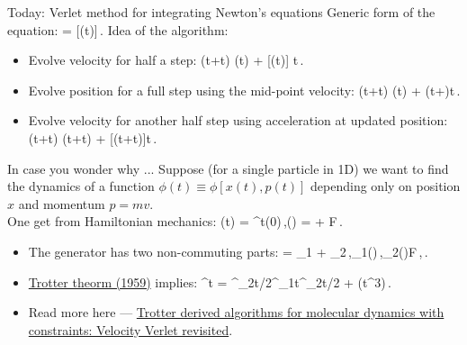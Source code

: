 \documentclass[11pt,aspectratio=169,handout]{beamer}
\begin{document}
\begin{frame}{Today: Verlet method for integrating Newton's equations}
		Generic form of the equation:
	\bea
	 = [(t)]\,.
	\eea\pause
	Idea of the algorithm:\pause
	\begin{itemize}[<+->]
		\item Evolve velocity for half a step: 
		\bea
			\left(t+\Delta t\right) \simeq {}(t) + [(t)] \Delta t\,.
		\eea
		\item Evolve position for a full step using the mid-point velocity:
		\bea
			(t+\Delta t) \simeq {}(t) + \left(t+\Delta\right)\Delta t\,.
		\eea
		\item Evolve velocity for another half step using acceleration at updated position:
		\bea
			(t+\Delta t) \simeq 	{}\left(t+\Delta t\right) + [(t+\Delta t)]\Delta t\,.
		\eea
	\end{itemize}
\end{frame}

\begin{frame}{In case you wonder why ...}\pause
	Suppose (for a single particle in 1D) we want to find the dynamics of a function $\phi(t)\equiv \phi[x(t), p(t)]$ depending only on position $x$ and momentum $p = mv$.\pause\\
	One get from Hamiltonian mechanics:
	\bea
		\phi(t) = \rme^{\rmi \lcal t}\phi(0)\,,\quad \rmi\lcal(\bigcdot) = \cdot{} + F\cdot\dfrac{\partial(\bigcdot)}{\partial p}\,.
	\eea\pause
	\begin{itemize}[<+->]
		\item The generator has two non-commuting parts: 
		\bea
			\rmi\lcal = \rmi\lcal_1 + \rmi\lcal_2\,,\quad\rmi\lcal_1(\bigcdot)\equiv{}\cdot{}\,,\quad\rmi\lcal_2(\bigcdot)\equiv F\cdot{}\,,\neq 0\,.
		\eea
		\item \href{https://www.jstor.org/stable/2033649?seq=7}{Trotter theorm (1959)} implies:
		\bea
			\rme^{\rmi\lcal\Delta t} = \rme^{\rmi\lcal_2\Delta t/2}\cdot\rme^{\rmi\lcal_1\Delta t}\cdot\rme^{\rmi\lcal_2\Delta t/2} + \ocal(\Delta t^3)\,.
		\eea
		\item Read more here --- \href{https://www.sciencedirect.com/science/article/abs/pii/S0021999106003603}{Trotter derived algorithms for molecular dynamics with constraints: Velocity Verlet revisited}.
	\end{itemize}
\end{frame}
\end{document}
